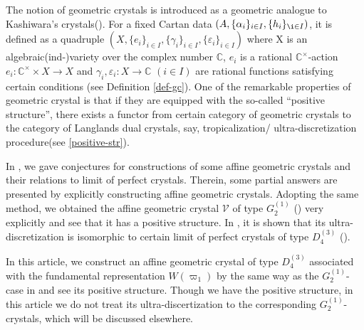 The notion of geometric crystals is introduced as 
a geometric analogue to Kashiwara's crystals(\cite{BK}).
For a fixed Cartan data $(A,\{{\alpha}_i\}_{i\in I},\{h_i\}_{\i\in I})$, it
is defined as a quadruple $(X,\{e_i\}_{i\in I},
\{\gamma_i\}_{i\in I}, \{{\varepsilon}_i\}_{i\in I})$
where X is 
an algebraic(ind-)variety over the complex number ${\mathbb C}$, 
$e_i$ is a rational ${\mathbb C}^\times$-action 
$e_i:{\mathbb C}^\times\times X\longrightarrow X$ and 
 $\gamma_i,{\varepsilon}_i
:X\longrightarrow {\mathbb C}$ $(i\in I)$ are 
rational functions satisfying certain conditions 
(see Definition \ref{def-gc}).
One of the remarkable properties of 
geometric crystal is that 
if they are equipped with the so-called 
``positive structure'',
there exists a functor from 
certain category of geometric crystals to
the category of Langlands dual crystals, say, 
tropicalization/
ultra-discretization procedure(see \ref{positive-str}).

In \cite{KNO}, we gave  conjectures for  
constructions of  some affine geometric crystals and 
their relations to limit of perfect crystals.
Therein, some partial answers are presented by 
explicitly constructing affine geometric crystals. 
Adopting the same method, we obtained 
the affine geometric crystal ${{\mathcal V}}$ of type ${G^{(1)}_{2}}$
(\cite{N3}) very explicitly and 
see that it has a positive structure.
In \cite{N4}, it is shown that 
its ultra-discretization is isomorphic to 
certain limit of perfect crystals of type 
${D^{(3)}_{4}}$ (\cite{KMOY}).

In this article, we construct an affine 
geometric crystal of type ${D^{(3)}_{4}}$ associated with 
the fundamental representation $W(\varpi_1)$ by
the same way as the ${G^{(1)}_{2}}$-case in \cite{N3}
and see its positive structure.
Though we have the positive structure, 
in this article 
we do not treat its ultra-discertization to the 
corresponding ${G^{(1)}_{2}}$-crystals,
which will be discussed elsewhere.

